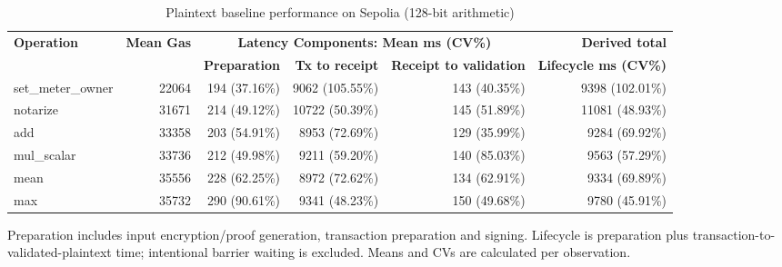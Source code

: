 \begin{table}[!t]
\caption{Plaintext baseline performance on Sepolia (128-bit arithmetic)}
\label{tab:baseline-sepolia-benchmark-128}
\centering
\scriptsize
\setlength{\tabcolsep}{4pt}
\begin{tabular}{|l|r|rrr|r|}
\hline
\textbf{Operation} &
\textbf{Mean Gas} &
\multicolumn{3}{c|}{\textbf{Latency Components: Mean ms (CV\%)}} &
\textbf{Derived total} \\
\cline{3-5}
& &
\textbf{Preparation} &
\textbf{Tx to receipt} &
\textbf{Receipt to validation} &
\textbf{Lifecycle ms (CV\%)} \\
\hline
set\_meter\_owner & 22064 & 194 (37.16\%) & 9062 (105.55\%) & 143 (40.35\%) & 9398 (102.01\%) \\
notarize & 31671 & 214 (49.12\%) & 10722 (50.39\%) & 145 (51.89\%) & 11081 (48.93\%) \\
add & 33358 & 203 (54.91\%) & 8953 (72.69\%) & 129 (35.99\%) & 9284 (69.92\%) \\
mul\_scalar & 33736 & 212 (49.98\%) & 9211 (59.20\%) & 140 (85.03\%) & 9563 (57.29\%) \\
mean & 35556 & 228 (62.25\%) & 8972 (72.62\%) & 134 (62.91\%) & 9334 (69.89\%) \\
max & 35732 & 290 (90.61\%) & 9341 (48.23\%) & 150 (49.68\%) & 9780 (45.91\%) \\
\hline
\end{tabular}
\vspace{2pt}
\parbox{\textwidth}{\scriptsize Preparation includes input encryption/proof generation, transaction preparation and signing. Lifecycle is preparation plus transaction-to-validated-plaintext time; intentional barrier waiting is excluded. Means and CVs are calculated per observation.}
\end{table}

